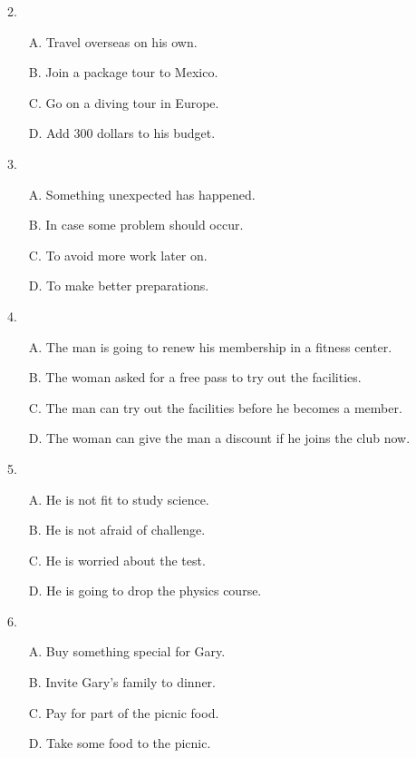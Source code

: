\documentclass[UTF8,11pt]{ctexart}
\begin{document}
2.


\begin{itemize}[leftmargin=2em,itemsep=.2em,topsep=.4em]\item[A.] Travel overseas on his own.
\item[B.] Join a package tour to Mexico.
\item[C.] Go on a diving tour in Europe.
\item[D.] Add 300 dollars to his budget.
\end{itemize}

3.


\begin{itemize}[leftmargin=2em,itemsep=.2em,topsep=.4em]\item[A.] Something unexpected has happened.
\item[B.] In case some problem should occur.
\item[C.] To avoid more work later on.
\item[D.] To make better preparations.
\end{itemize}

4.


\begin{itemize}[leftmargin=2em,itemsep=.2em,topsep=.4em]\item[A.] The man is going to renew his membership in a fitness center.
\item[B.] The woman asked for a free pass to try out the facilities.
\item[C.] The man can try out the facilities before he becomes a member.
\item[D.] The woman can give the man a discount if he joins the club now.
\end{itemize}

5.


\begin{itemize}[leftmargin=2em,itemsep=.2em,topsep=.4em]\item[A.] He is not fit to study science.
\item[B.] He is not afraid of challenge.
\item[C.] He is worried about the test.
\item[D.] He is going to drop the physics course.
\end{itemize}

6.


\begin{itemize}[leftmargin=2em,itemsep=.2em,topsep=.4em]\item[A.] Buy something special for Gary.
\item[B.] Invite Gary’s family to dinner.
\item[C.] Pay for part of the picnic food.
\item[D.] Take some food to the picnic.
\end{itemize}
\end{document}
